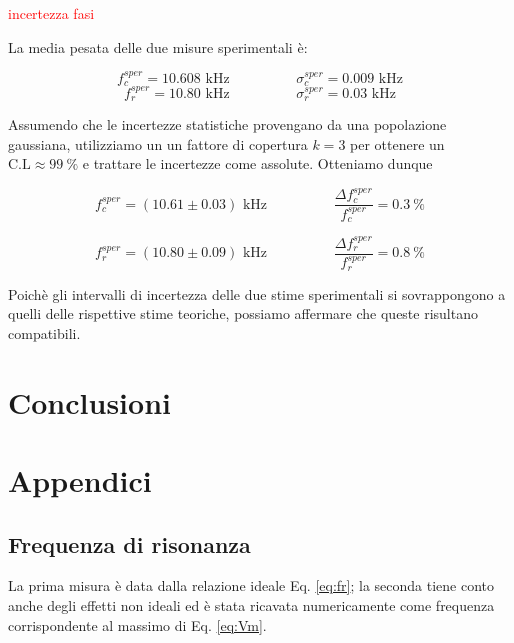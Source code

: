 \documentclass[12pt,italian]{article}
\newcommand{\err}[1]{\textcolor{red}{#1}}
\begin{document}
\err{incertezza fasi}

La media pesata delle due misure sperimentali è:

\begin{equation*}
	f_{c}^{sper} = 10.608 \text{ kHz}  \hspace{2cm}  \sigma_c^{sper} = 0.009 \text{ kHz}
\end{equation*}
\begin{equation*}
	f_{r}^{sper} = 10.80 \text{ kHz}  \hspace{2cm}  \sigma_r^{sper} = 0.03  \text{ kHz}
\end{equation*}

Assumendo che le incertezze statistiche provengano da una popolazione
gaussiana, utilizziamo un un fattore di copertura $k = 3$ per ottenere un
$\text{C.L}\approx 99 \ \% $ e trattare le incertezze come assolute. Otteniamo
dunque

\begin{equation*}
	f_{c}^{sper} = (10.61 \pm 0.03) \text{ kHz} \hspace{2cm} \frac{\Delta f_{c}^{sper}}{f_{c}^{sper}} = 0.3 \ \%
\end{equation*}

\begin{equation*}
	f_{r}^{sper} = (10.80 \pm 0.09) \text{ kHz} \hspace{2cm} \frac{\Delta f_{r}^{sper}}{f_{r}^{sper}} = 0.8 \ \%
\end{equation*}

Poichè gli intervalli di incertezza delle due stime sperimentali si
sovrappongono a quelli delle rispettive stime teoriche, possiamo affermare che
queste risultano compatibili.

\section*{Conclusioni}

\appendix
\section{Appendici}
\subsection{Frequenza di risonanza}\label{sec:resFreq}
La prima misura è data dalla relazione ideale Eq. \eqref{eq:fr}; la seconda
tiene conto anche degli effetti non ideali ed è stata ricavata numericamente
come frequenza corrispondente al massimo di Eq. \eqref{eq:Vm}.
\end{document}
